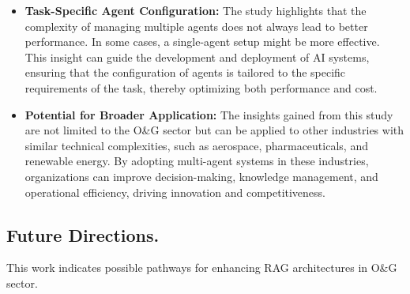\begin{itemize}
                    \item \textbf{Task-Specific Agent Configuration:}
                        The study highlights that the complexity of managing multiple agents does not always lead to better performance. In some cases, a single-agent setup might be more effective.
                        This insight can guide the development and deployment of AI systems, ensuring that the configuration of agents is tailored to the specific requirements of the task, thereby optimizing both performance and cost.           
                        
                    \item \textbf{Potential for Broader Application:}
                        The insights gained from this study are not limited to the O\&G sector but can be applied to other industries with similar technical complexities, such as aerospace, pharmaceuticals, and renewable energy.
                        By adopting multi-agent systems in these industries, organizations can improve decision-making, knowledge management, and operational efficiency, driving innovation and competitiveness.             
                    
                \end{itemize}
                    
                
        \subsection{Future Directions.} 

            This work indicates possible pathways for enhancing RAG architectures in O\&G sector. 
            
